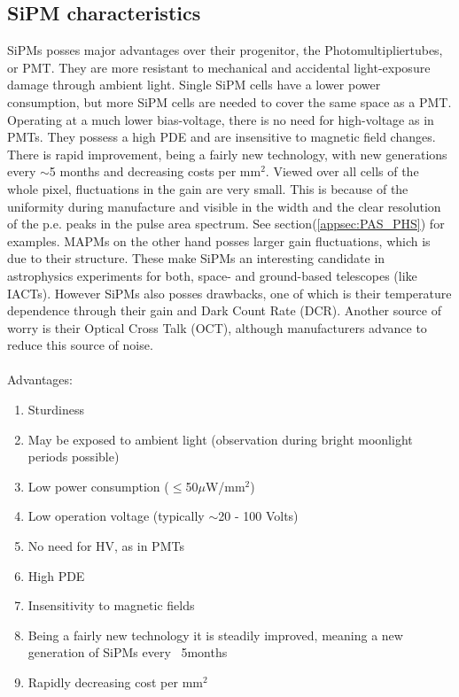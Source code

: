 \documentclass[12pt,article,type=msc,colorback,accentcolor=tud9c]{tudthesis}
\begin{document}
\subsection{SiPM characteristics}
\begin{figure}[b!]
\begin{centering}
}
\caption[Structure and carrier multiplication through an avalanche inside a SiPM]{Structure and carrier multiplication through an avalanche inside a SiPM. Picture from \cite{HPK_SiPM}}
\label{fig:SiPM_scheme}
\end{centering}
\end{figure}
SiPMs posses major advantages over their progenitor, the Photomultipliertubes, or PMT. They are more resistant to mechanical and accidental light-exposure damage through ambient light. Single SiPM cells have a lower power consumption, but more SiPM cells are needed to cover the same space as a PMT. Operating at a much lower bias-voltage, there is no need for high-voltage as in PMTs. They possess a high PDE and are insensitive to magnetic field changes. There is rapid improvement, being a fairly new technology, with new generations every $\sim$5 months and decreasing costs per mm$^2$. Viewed over all cells of the whole pixel, fluctuations in the gain are very small. This is because of the uniformity during manufacture and visible in the width and the clear resolution of the p.e. peaks in the pulse area spectrum. See section(\ref{appsec:PAS_PHS}) for examples. MAPMs on the other hand posses larger gain fluctuations, which is due to their structure. These make SiPMs an interesting candidate in astrophysics experiments for both, space- and ground-based telescopes (like IACTs). However SiPMs also posses drawbacks, one of which is their temperature dependence through their gain and Dark Count Rate (DCR). Another source of worry is their Optical Cross Talk (OCT), although manufacturers advance to reduce this source of noise.\\\\
\noindent Advantages:
\begin{multicols}{2}
\begin{enumerate}[topsep=0pt,itemsep=-1ex,partopsep=1ex,parsep=1ex]
\item Sturdiness
\item May be exposed to ambient light (observation during bright moonlight periods possible)
\item Low power consumption ($\leq$50$\mu$W/mm$^2$)
\item Low operation voltage (typically $\sim$20 - 100 Volts)
\item No need for HV, as in PMTs
\item High PDE
\item Insensitivity to magnetic fields
\item Being a fairly new technology it is steadily improved, meaning a new generation of SiPMs every ~5months
\item Rapidly decreasing cost per mm$^2$
\end{enumerate}
\end{multicols}
\end{document}
